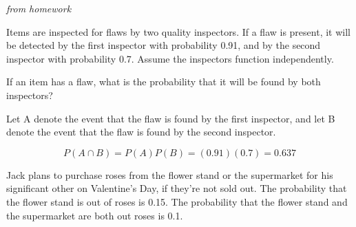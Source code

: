 \documentclass[12pt, addpoints]{exam}
\begin{document}
\begin{questions}

\question[3]

\emph{from homework}

Items are inspected for flaws by two quality inspectors.
If a flaw is present, it will be detected by the first inspector with probability 0.91, and by the second inspector with probability 0.7.
Assume the inspectors function independently.

If an item has a flaw, what is the probability that it will be found by both inspectors?

\begin{solution} 

Let A denote the event that the flaw is found by the first inspector, and let B denote the event that the flaw is found by the second inspector.

\[
P(A \cap B) = P(A)P(B) = (0.91)(0.7) = 0.637
\]

\end{solution}


\question 

Jack plans to purchase roses from the flower stand or the supermarket for his significant other on Valentine's Day, if they're not sold out.
The probability that the flower stand is out of roses is 0.15.
The probability that the flower stand and the supermarket are both out roses is 0.1.


\end{questions}

\newpage
\begin{center}
\gradetable[v][questions]
\end{center}
\end{document}
